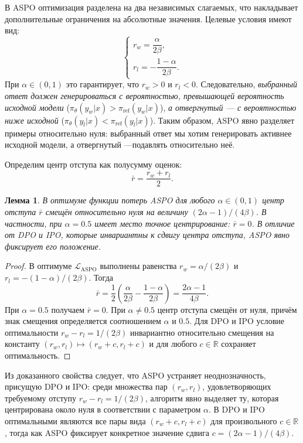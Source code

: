 \documentclass[a4paper,12pt]{article}
\newtheorem{lemma}{Лемма}
\begin{document}
В ASPO оптимизация разделена на два независимых слагаемых, что накладывает дополнительные ограничения на абсолютные значения. Целевые условия имеют вид:
\[
\begin{cases}
r_w = \dfrac{\alpha}{2\beta}, \\[8pt]
r_l = -\dfrac{1-\alpha}{2\beta}.
\end{cases}
\]
При \(\alpha \in (0, 1)\) это гарантирует, что \(r_w > 0\) и \(r_l < 0\). Следовательно, \textit{выбранный ответ должен генерироваться с вероятностью, превышающей вероятность исходной модели} (\(\pi_\theta(y_w|x) > \pi_{\text{ref}}(y_w|x)\)), \textit{а отвергнутый — с вероятностью ниже исходной} (\(\pi_\theta(y_l|x) < \pi_{\text{ref}}(y_l|x)\)). Таким образом, ASPO явно разделяет примеры относительно нуля: выбранный ответ мы хотим генерировать активнее исходной модели, а отвергнутый —подавлять относительно неё.

Определим центр отступа как полусумму оценок:
\[
\bar{r} = \frac{r_w + r_l}{2}.
\]


\begin{lemma}
  В оптимуме функции потерь ASPO для любого \(\alpha \in (0,1)\) центр отступа \(\bar{r}\) смещён относительно нуля на величину \((2\alpha - 1)/(4\beta)\). В частности, при \(\alpha = 0.5\) имеет место точное центрирование: \(\bar{r} = 0\). В отличие от DPO и IPO, которые инвариантны к сдвигу центра отступа, ASPO явно фиксирует его положение.
\end{lemma}

\begin{proof} В оптимуме \(\mathcal{L}_{\text{ASPO}}\) выполнены равенства \(r_w = \alpha/(2\beta)\) и \(r_l = -(1-\alpha)/(2\beta)\). Тогда
\[
\bar{r} = \frac{1}{2}\left( \frac{\alpha}{2\beta} - \frac{1-\alpha}{2\beta} \right) = \frac{2\alpha - 1}{4\beta}.
\]
При \(\alpha = 0.5\) получаем \(\bar{r} = 0\). При \(\alpha \neq 0.5\) центр отступа смещён от нуля, причём знак смещения определяется соотношением \(\alpha\) и \(0.5\). Для DPO и IPO условие оптимальности \(r_w - r_l = 1/(2\beta)\) инвариантно относительно смещения на константу \((r_w, r_l) \mapsto (r_w + c, r_l + c)\) и для любого \(c \in \mathbb{R}\) сохраняет оптимальность.
\end{proof}

Из доказанного свойства следует, что ASPO устраняет неоднозначность, присущую DPO и IPO: среди множества пар $(r_w, r_l)$, удовлетворяющих требуемому отступу $r_w - r_l = 1/(2\beta)$, алгоритм явно выделяет ту, которая центрирована около нуля в соответствии с параметром $\alpha$. В DPO и IPO оптимальными являются все пары вида $(r_w + c, r_l + c)$ для произвольного $c \in \mathbb{R}$, тогда как ASPO фиксирует конкретное значение сдвига $c = (2\alpha - 1)/(4\beta)$.
\end{document}
